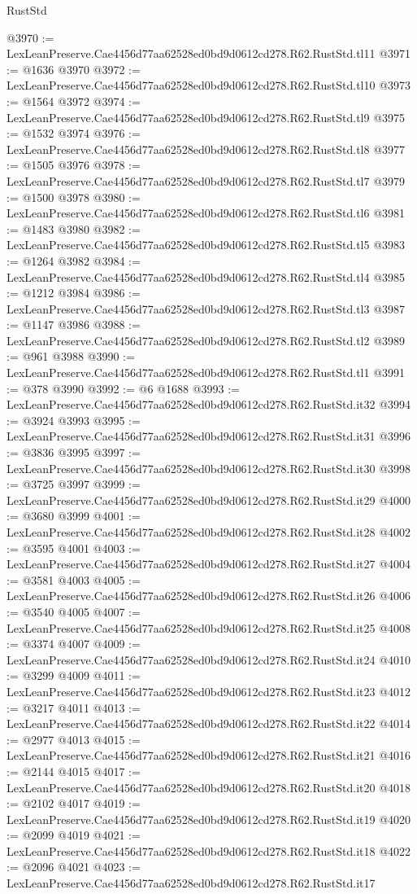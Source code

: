 \begin{lexlean}{RustStd}
\begin{coremodule}
@3970 := LexLeanPreserve.Cae4456d77aa62528ed0bd9d0612cd278.R62.RustStd.tl11
@3971 := @1636 @3970
@3972 := LexLeanPreserve.Cae4456d77aa62528ed0bd9d0612cd278.R62.RustStd.tl10
@3973 := @1564 @3972
@3974 := LexLeanPreserve.Cae4456d77aa62528ed0bd9d0612cd278.R62.RustStd.tl9
@3975 := @1532 @3974
@3976 := LexLeanPreserve.Cae4456d77aa62528ed0bd9d0612cd278.R62.RustStd.tl8
@3977 := @1505 @3976
@3978 := LexLeanPreserve.Cae4456d77aa62528ed0bd9d0612cd278.R62.RustStd.tl7
@3979 := @1500 @3978
@3980 := LexLeanPreserve.Cae4456d77aa62528ed0bd9d0612cd278.R62.RustStd.tl6
@3981 := @1483 @3980
@3982 := LexLeanPreserve.Cae4456d77aa62528ed0bd9d0612cd278.R62.RustStd.tl5
@3983 := @1264 @3982
@3984 := LexLeanPreserve.Cae4456d77aa62528ed0bd9d0612cd278.R62.RustStd.tl4
@3985 := @1212 @3984
@3986 := LexLeanPreserve.Cae4456d77aa62528ed0bd9d0612cd278.R62.RustStd.tl3
@3987 := @1147 @3986
@3988 := LexLeanPreserve.Cae4456d77aa62528ed0bd9d0612cd278.R62.RustStd.tl2
@3989 := @961 @3988
@3990 := LexLeanPreserve.Cae4456d77aa62528ed0bd9d0612cd278.R62.RustStd.tl1
@3991 := @378 @3990
@3992 := @6 @1688
@3993 := LexLeanPreserve.Cae4456d77aa62528ed0bd9d0612cd278.R62.RustStd.it32
@3994 := @3924 @3993
@3995 := LexLeanPreserve.Cae4456d77aa62528ed0bd9d0612cd278.R62.RustStd.it31
@3996 := @3836 @3995
@3997 := LexLeanPreserve.Cae4456d77aa62528ed0bd9d0612cd278.R62.RustStd.it30
@3998 := @3725 @3997
@3999 := LexLeanPreserve.Cae4456d77aa62528ed0bd9d0612cd278.R62.RustStd.it29
@4000 := @3680 @3999
@4001 := LexLeanPreserve.Cae4456d77aa62528ed0bd9d0612cd278.R62.RustStd.it28
@4002 := @3595 @4001
@4003 := LexLeanPreserve.Cae4456d77aa62528ed0bd9d0612cd278.R62.RustStd.it27
@4004 := @3581 @4003
@4005 := LexLeanPreserve.Cae4456d77aa62528ed0bd9d0612cd278.R62.RustStd.it26
@4006 := @3540 @4005
@4007 := LexLeanPreserve.Cae4456d77aa62528ed0bd9d0612cd278.R62.RustStd.it25
@4008 := @3374 @4007
@4009 := LexLeanPreserve.Cae4456d77aa62528ed0bd9d0612cd278.R62.RustStd.it24
@4010 := @3299 @4009
@4011 := LexLeanPreserve.Cae4456d77aa62528ed0bd9d0612cd278.R62.RustStd.it23
@4012 := @3217 @4011
@4013 := LexLeanPreserve.Cae4456d77aa62528ed0bd9d0612cd278.R62.RustStd.it22
@4014 := @2977 @4013
@4015 := LexLeanPreserve.Cae4456d77aa62528ed0bd9d0612cd278.R62.RustStd.it21
@4016 := @2144 @4015
@4017 := LexLeanPreserve.Cae4456d77aa62528ed0bd9d0612cd278.R62.RustStd.it20
@4018 := @2102 @4017
@4019 := LexLeanPreserve.Cae4456d77aa62528ed0bd9d0612cd278.R62.RustStd.it19
@4020 := @2099 @4019
@4021 := LexLeanPreserve.Cae4456d77aa62528ed0bd9d0612cd278.R62.RustStd.it18
@4022 := @2096 @4021
@4023 := LexLeanPreserve.Cae4456d77aa62528ed0bd9d0612cd278.R62.RustStd.it17

\end{coremodule}
\end{lexlean}
